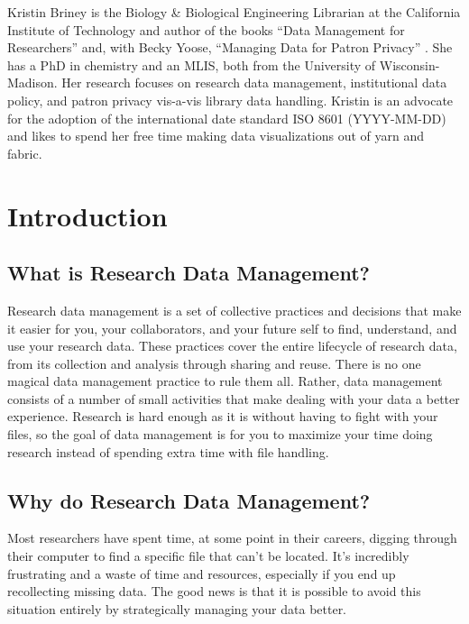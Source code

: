 \documentclass[
]{book}
\begin{document}
Kristin Briney is the Biology \& Biological Engineering Librarian at the California Institute of Technology and author of the books ``Data Management for Researchers'' \citep{briney_data_2015} and, with Becky Yoose, ``Managing Data for Patron Privacy'' \citep{briney_managing_2022}. She has a PhD in chemistry and an MLIS, both from the University of Wisconsin-Madison. Her research focuses on research data management, institutional data policy, and patron privacy vis-a-vis library data handling. Kristin is an advocate for the adoption of the international date standard ISO 8601 (YYYY-MM-DD) and likes to spend her free time making data visualizations out of yarn and fabric.

\hypertarget{introduction}{%
\chapter{Introduction}\label{introduction}}

\hypertarget{what-rdm}{%
\section{What is Research Data Management?}\label{what-rdm}}

Research data management is a set of collective practices and decisions that make it easier for you, your collaborators, and your future self to find, understand, and use your research data. These practices cover the entire lifecycle of research data, from its collection and analysis through sharing and reuse. There is no one magical data management practice to rule them all. Rather, data management consists of a number of small activities that make dealing with your data a better experience. Research is hard enough as it is without having to fight with your files, so the goal of data management is for you to maximize your time doing research instead of spending extra time with file handling.

\hypertarget{why-rdm}{%
\section{Why do Research Data Management?}\label{why-rdm}}

Most researchers have spent time, at some point in their careers, digging through their computer to find a specific file that can't be located. It's incredibly frustrating and a waste of time and resources, especially if you end up recollecting missing data. The good news is that it is possible to avoid this situation entirely by strategically managing your data better.
\end{document}
